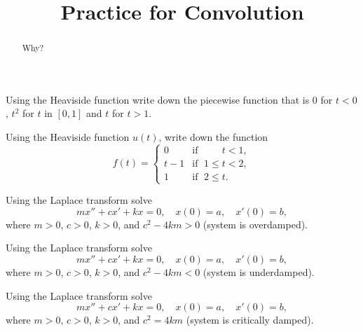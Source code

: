 \documentclass{ximera}
\title{Practice for Convolution}
\begin{document}
\begin{abstract}
Why?
\end{abstract}
\maketitle


\begin{exercise}
    Using the Heaviside function write down the piecewise function that is 0 for $t < 0$, $t^2$ for $t$ in $[0,1]$ and $t$ for $t > 1$.
\end{exercise}

\begin{exercise}%
    Using the Heaviside function $u(t)$, write down the function
    \begin{equation*}
        f(t) =
        \begin{cases}
            0 & \text{if } \; \phantom{1 \leq {}} t < 1  , \\
            t-1 & \text{if } \; 1 \leq t < 2 , \\
            1 & \text{if } \; 2 \leq t .
        \end{cases}
    \end{equation*}
\end{exercise}

\begin{exercise}
    Using the Laplace transform solve
    \begin{equation*}
        m x'' + c x' + k x = 0 , \quad x(0) = a, \quad x'(0) = b ,
    \end{equation*}
    where $m > 0$, $c > 0$, $k > 0$, and $c^2 - 4km > 0$ (system is overdamped).
\end{exercise}

\begin{exercise}
    Using the Laplace transform solve
    \begin{equation*}
        m x'' + c x' + k x = 0 , \quad x(0) = a, \quad x'(0) = b ,
    \end{equation*}
    where $m > 0$, $c > 0$, $k > 0$, and $c^2 - 4km < 0$ (system is underdamped).
\end{exercise}

\begin{exercise}
    Using the Laplace transform solve
    \begin{equation*}
        m x'' + c x' + k x = 0 , \quad x(0) = a, \quad x'(0) = b ,
    \end{equation*}
    where $m > 0$, $c > 0$, $k > 0$, and $c^2 = 4km$ (system is critically damped).
\end{exercise}
\end{document}
